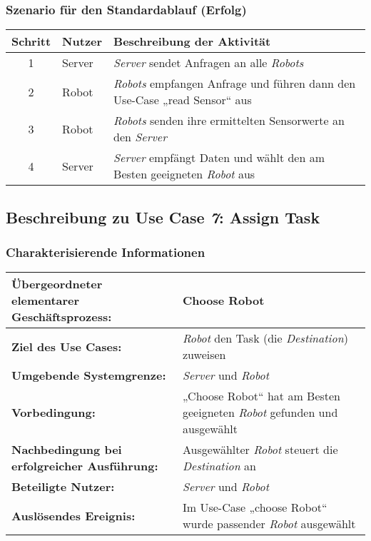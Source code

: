 			\subsubsection*{Szenario für den Standardablauf (Erfolg)}

			\begin{table}[H]
				\centering
				\begin{tabularx}{\textwidth}{@{}cp{2cm}X@{}}
				\hline
				Schritt & Nutzer & Beschreibung der Aktivität \\ \hline
				1 & Server & \emph{Server} sendet Anfragen an alle \emph{Robots} \\
				2 & Robot & \emph{Robots} empfangen Anfrage und führen dann den Use-Case „read Sensor“ aus \\
				3 & Robot & \emph{Robots} senden ihre ermittelten Sensorwerte an den \emph{Server}\\
				4 & Server & \emph{Server} empfängt Daten und wählt den am Besten geeigneten \emph{Robot} aus \\
				\hline
				\end{tabularx}
			\end{table}

			
		\pagebreak

		\subsection{Beschreibung zu Use Case \emph{7}: Assign Task}

			\subsubsection*{Charakterisierende Informationen}

			\begin{table}[H]
				\centering
				\begin{tabularx}{\textwidth}{@{}p{5cm}X@{}}
				\hline
				\textbf{Übergeordneter elementarer Geschäftsprozess:} & Choose Robot  \\ \hline
				\textbf{Ziel des Use Cases:} & \emph{Robot} den Task (die \emph{Destination}) zuweisen\\ \hline
				\textbf{Umgebende Systemgrenze:} & \emph{Server} und \emph{Robot} \\ \hline
				\textbf{Vorbedingung:} & „Choose Robot“ hat am Besten geeigneten \emph{Robot} gefunden und ausgewählt\\ \hline
				\textbf{Nachbedingung bei erfolgreicher Ausführung:} & Ausgewählter \emph{Robot} steuert die \emph{Destination} an\\ \hline
				\textbf{Beteiligte Nutzer:} & \emph{Server} und \emph{Robot}\\ \hline
				\textbf{Auslösendes Ereignis:} & Im Use-Case „choose Robot“ wurde passender \emph{Robot} ausgewählt\\
				\hline
				\end{tabularx}
			\end{table}
			
